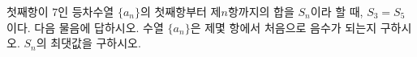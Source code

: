 첫째항이 $7$인 등차수열 $\{a_n\}$의 첫째항부터 제$n$항까지의 합을 $S_n$이라 할 때, $S_3=S_5$이다. 다음 물음에 답하시오.
 수열 $\{a_n\}$은 제몇 항에서 처음으로 음수가 되는지 구하시오.
 $S_n$의 최댓값을 구하시오.
